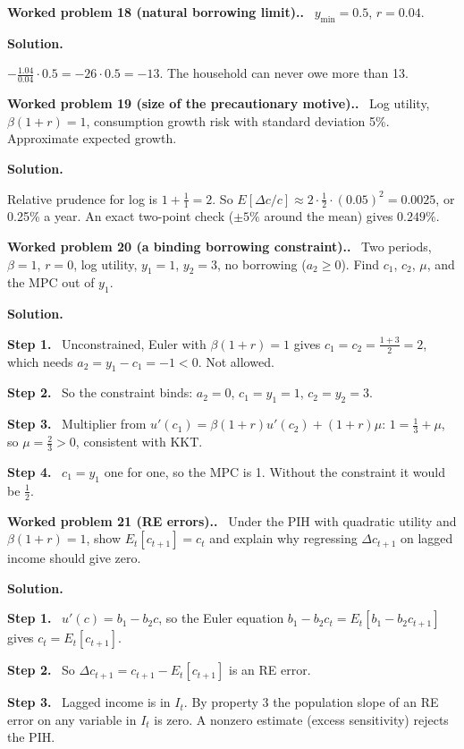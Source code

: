 \documentclass[12pt]{article}
\newcommand{\st}[1]{\par\smallskip\textbf{Step #1.}\ }
\newcommand{\prob}[1]{\par\bigskip\textbf{Worked problem #1.}\ }
\newcommand{\sol}{\par\smallskip\textbf{Solution.}\par}
\begin{document}
\prob{18 (natural borrowing limit).} $y_{\min}=0.5$, $r=0.04$.
\sol
$-\frac{1.04}{0.04}\cdot0.5=-26\cdot0.5=-13$. The household can never owe more than 13.

\prob{19 (size of the precautionary motive).} Log utility, $\beta(1+r)=1$,
consumption growth risk with standard deviation 5\%. Approximate expected growth.
\sol
Relative prudence for log is $1+\frac11=2$. So $E[\Delta c/c]\approx2\cdot\frac12\cdot(0.05)^2=0.0025$, or 0.25\% a year.
An exact two-point check ($\pm5\%$ around the mean) gives $0.249\%$.

\prob{20 (a binding borrowing constraint).} Two periods, $\beta=1$, $r=0$, log utility,
$y_1=1$, $y_2=3$, no borrowing ($a_2\ge0$). Find $c_1$, $c_2$, $\mu$, and the MPC out of $y_1$.
\sol
\st{1} Unconstrained, Euler with $\beta(1+r)=1$ gives $c_1=c_2=\frac{1+3}{2}=2$, which needs $a_2=y_1-c_1=-1<0$. Not allowed.
\st{2} So the constraint binds: $a_2=0$, $c_1=y_1=1$, $c_2=y_2=3$.
\st{3} Multiplier from $u'(c_1)=\beta(1+r)u'(c_2)+(1+r)\mu$: $1=\frac13+\mu$, so $\mu=\frac23>0$, consistent with KKT.
\st{4} $c_1=y_1$ one for one, so the MPC is 1. Without the constraint it would be $\frac12$.

\prob{21 (RE errors).} Under the PIH with quadratic utility and $\beta(1+r)=1$, show $E_t[c_{t+1}]=c_t$ and explain why regressing $\Delta c_{t+1}$ on lagged income should give zero.
\sol
\st{1} $u'(c)=b_1-b_2c$, so the Euler equation $b_1-b_2c_t=E_t[b_1-b_2c_{t+1}]$ gives $c_t=E_t[c_{t+1}]$.
\st{2} So $\Delta c_{t+1}=c_{t+1}-E_t[c_{t+1}]$ is an RE error.
\st{3} Lagged income is in $I_t$. By property 3 the population slope of an RE error on any variable in $I_t$ is zero. A nonzero estimate (excess sensitivity) rejects the PIH.

\end{document}
